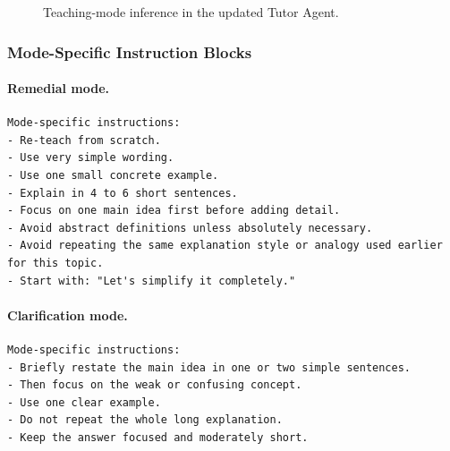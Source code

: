 \documentclass[11pt,a4paper]{article}
\begin{document}
\begin{figure}[H]
\centering
{}
\caption{Teaching-mode inference in the updated Tutor Agent.}
\end{figure}

\subsubsection{Mode-Specific Instruction Blocks}

\paragraph{Remedial mode.}
\begin{lstlisting}
Mode-specific instructions:
- Re-teach from scratch.
- Use very simple wording.
- Use one small concrete example.
- Explain in 4 to 6 short sentences.
- Focus on one main idea first before adding detail.
- Avoid abstract definitions unless absolutely necessary.
- Avoid repeating the same explanation style or analogy used earlier for this topic.
- Start with: "Let's simplify it completely."
\end{lstlisting}

\paragraph{Clarification mode.}
\begin{lstlisting}
Mode-specific instructions:
- Briefly restate the main idea in one or two simple sentences.
- Then focus on the weak or confusing concept.
- Use one clear example.
- Do not repeat the whole long explanation.
- Keep the answer focused and moderately short.
\end{lstlisting}
\end{document}
